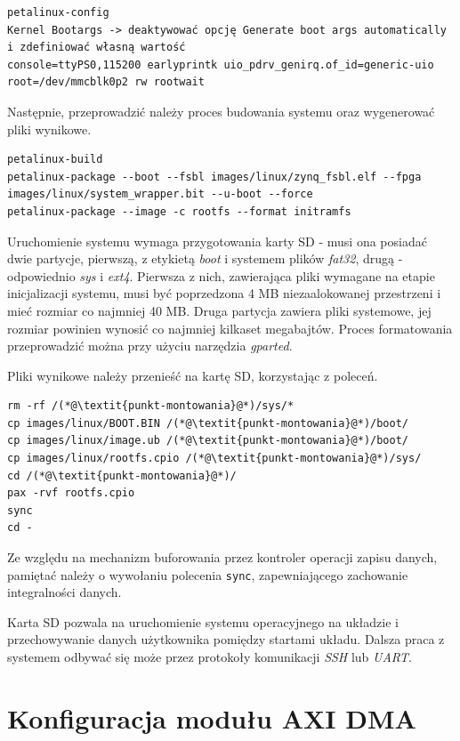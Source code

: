 \begin{lstlisting}[breaklines=true]
petalinux-config
Kernel Bootargs -> deaktywować opcję Generate boot args automatically i zdefiniować własną wartość
console=ttyPS0,115200 earlyprintk uio_pdrv_genirq.of_id=generic-uio root=/dev/mmcblk0p2 rw rootwait 
\end{lstlisting}
Następnie, przeprowadzić należy proces budowania systemu oraz wygenerować pliki wynikowe.

\begin{lstlisting}[breaklines=true]
petalinux-build
petalinux-package --boot --fsbl images/linux/zynq_fsbl.elf --fpga images/linux/system_wrapper.bit --u-boot --force
petalinux-package --image -c rootfs --format initramfs
\end{lstlisting}

Uruchomienie systemu wymaga przygotowania karty SD - musi ona posiadać dwie partycje, pierwszą, z etykietą \emph{boot} i systemem plików \emph{fat32}, drugą - odpowiednio \emph{sys} i \emph{ext4}. Pierwsza z nich, zawierająca pliki wymagane na etapie inicjalizacji systemu, musi być poprzedzona 4 MB niezaalokowanej przestrzeni i mieć rozmiar co najmniej 40 MB. Druga partycja zawiera pliki systemowe, jej rozmiar powinien wynosić co najmniej kilkaset megabajtów. Proces formatowania przeprowadzić można przy użyciu narzędzia \emph{gparted}.

Pliki wynikowe należy przenieść na kartę SD, korzystając z poleceń.

\begin{lstlisting}[breaklines=true]
rm -rf /(*@\textit{punkt-montowania}@*)/sys/*
cp images/linux/BOOT.BIN /(*@\textit{punkt-montowania}@*)/boot/
cp images/linux/image.ub /(*@\textit{punkt-montowania}@*)/boot/
cp images/linux/rootfs.cpio /(*@\textit{punkt-montowania}@*)/sys/
cd /(*@\textit{punkt-montowania}@*)/
pax -rvf rootfs.cpio
sync
cd -
\end{lstlisting}

Ze względu na mechanizm buforowania przez kontroler operacji zapisu danych, pamiętać należy o wywołaniu polecenia \texttt{sync}, zapewniającego zachowanie integralności danych.

Karta SD pozwala na uruchomienie systemu operacyjnego na układzie i przechowywanie danych użytkownika pomiędzy startami układu. Dalsza praca z systemem odbywać się może przez protokoły komunikacji \emph{SSH} lub \emph{UART}.

\section{Konfiguracja modułu AXI DMA}
\label{sec:vivado-axi-dma}

